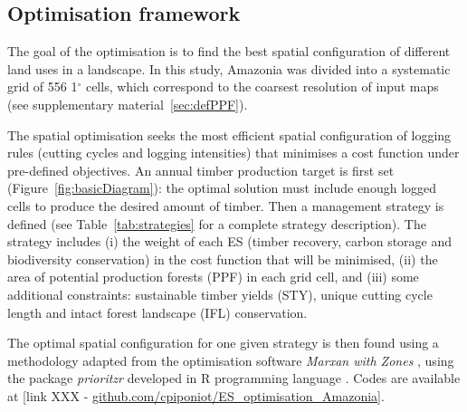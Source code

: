 \documentclass{article}
\begin{document}
\subsection{Optimisation framework}

The goal of the optimisation is to find the best spatial configuration of different land uses in a landscape. In this study, Amazonia was divided into a systematic grid of 556 1$^{\circ}$ cells, which correspond to the coarsest resolution of input maps (see supplementary material~\ref{sec:defPPF}). 

The spatial optimisation seeks the most efficient spatial configuration of logging rules (cutting cycles and logging intensities) that minimises a cost function under pre-defined objectives. An annual timber production target is first set (Figure~\ref{fig:basicDiagram}): the optimal solution must include enough logged cells to produce the desired amount of timber. Then a management strategy is defined (see Table~\ref{tab:strategies} for a complete strategy description). The strategy includes (i) the weight of each ES (timber recovery, carbon storage and biodiversity conservation) in the cost function that will be minimised, (ii) the area of potential production forests (PPF) in each grid cell, and (iii) some additional constraints: sustainable timber yields (STY), unique cutting cycle length and intact forest landscape (IFL) conservation. 

The optimal spatial configuration for one given strategy is then found using a methodology adapted from the optimisation software \textit{Marxan with Zones} \cite{Watts2009}, using the package \textit{prioritzr} \cite{Hanson2018} developed in R programming language \cite{RCoreTeam2017}. Codes are available at [link XXX - \url{github.com/cpiponiot/ES_optimisation_Amazonia}]. 
\end{document}
